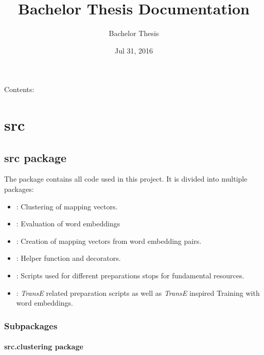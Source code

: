 \documentclass[letterpaper,10pt,english]{sphinxmanual}
\title{Bachelor Thesis Documentation}
\date{Jul 31, 2016}
\author{Bachelor Thesis}
\begin{document}
\maketitle
\tableofcontents
{}\label{index::doc}


Contents:


\chapter{src}
\label{index:src}\label{index:welcome-to-bachelor-thesis-s-documentation}

\section{src package}
\label{src::doc}\label{src:src-package}
The  package contains all code used in this project.
It is divided into multiple packages:
\begin{itemize}
\item {} 
: Clustering of mapping vectors.

\item {} 
: Evaluation of word embeddings

\item {} 
: Creation of mapping vectors from word embedding pairs.

\item {} 
: Helper function and decorators.

\item {} 
: Scripts used for different preparations stops for fundamental resources.

\item {} 
: \emph{TransE} related preparation scripts as well as \emph{TransE} inspired Training with word embeddings.

\end{itemize}


\subsection{Subpackages}
\label{src:subpackages}

\subsubsection{src.clustering package}
\label{src.clustering:src-clustering-package}\label{src.clustering::doc}
\end{document}
